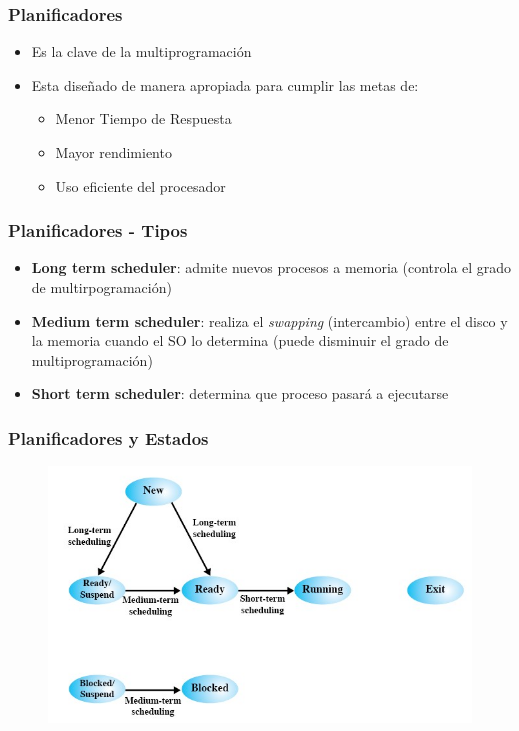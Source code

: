 \begin{frame}
  \frametitle{Planificadores}
  \begin{itemize}
	  \item Es la clave de la multiprogramación
	  \item Esta diseñado de manera apropiada para cumplir las metas de:
	  \begin{itemize}
	  	\item Menor Tiempo de Respuesta
	  	\item Mayor rendimiento
	  	\item Uso eficiente del procesador
	  \end{itemize}
  \end{itemize}
\end{frame}

\begin{frame}
  \frametitle{Planificadores - Tipos}
  \begin{itemize}
		\item \textbf{Long term scheduler}: admite nuevos procesos a memoria (controla el grado de multirpogramación)
		\item \textbf{Medium term scheduler}: realiza el \emph{swapping} (intercambio) entre el disco y la memoria cuando el SO lo determina (puede disminuir el grado de multiprogramación)
		\item \textbf{Short term scheduler}: determina que proceso pasará a ejecutarse
  \end{itemize}
\end{frame}

\begin{frame}
  \frametitle{Planificadores y Estados}
  \begin{figure}
    \includegraphics[scale=0.4]{images/statesSchedulers.png}
  \end{figure}
\end{frame}


